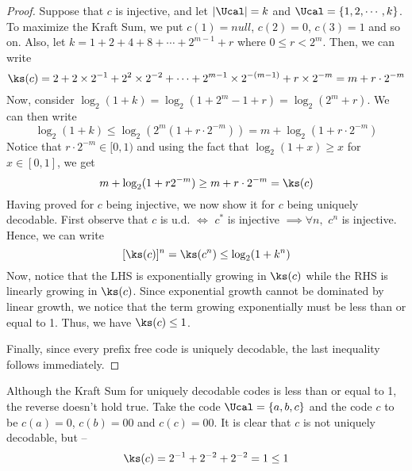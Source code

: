 \begin{proof}
Suppose that $c$ is injective, and let $|\Ucal| = k$ and $\Ucal = \{1, 2, \cdots, k\}$. To maximize the Kraft Sum, we put $c(1) = null$, $c(2) = 0$, $c(3) = 1$ and so on. Also, let $k = 1 + 2 + 4 + 8 + \cdots + 2^{m-1} + r$ where $0 \leq r < 2^m$. Then, we can write
\[\ks(c) = 2 + 2 \times 2^{-1} + 2^2 \times 2^{-2} + \cdots + 2^{m-1}\times 2^{-(m-1)} + r \times 2^{-m} = m + r \cdot 2^{-m}\]
Now, consider $\log_2(1+k) = \log_2(1 + 2^{m} - 1 + r) = \log_2(2^m + r)$. We can then write \[\log_2(1+k) \leq \log_2(2^m(1+r\cdot2^{-m})) = m + \log_2(1+r\cdot 2^{-m}) \]
Notice that $r\cdot 2^{-m} \in [0,1)$ and using the fact that $\log_2(1+x) \geq x$ for $x\in[0,1]$, we get
\[m + \log_2(1+r2^{-m}) \geq m + r\cdot2^{-m} = \ks(c)\]
Having proved for $c$ being injective, we now show it for $c$ being uniquely decodable. First observe that $c$ is u.d. $\iff$ $c^*$ is injective $\implies \forall n,$ $c^n$ is injective. Hence, we can write
\[
[\ks(c)]^n = \ks(c^n) \leq \log_2(1+k^n)
\]
Now, notice that the LHS is exponentially growing in $\ks(c)$ while the RHS is linearly growing in $\ks(c)$. Since exponential growth cannot be dominated by linear growth, we notice that the term growing exponentially must be less than or equal to 1. Thus, we have $\ks(c) \leq 1$.

\noindent
Finally, since every prefix free code is uniquely decodable, the last inequality follows immediately.
\end{proof}
\begin{remark}
Although the Kraft Sum for uniquely decodable codes is less than or equal to 1, the reverse doesn't hold true. Take the code $\Ucal = \{a,b,c\}$ and the code $c$ to be $c(a) = 0$, $c(b) = 00$ and $c(c) = 00$. It is clear that $c$ is not uniquely decodable, but --
\[
\ks(c) = 2^{-1} + 2^{-2} + 2^{-2}  = 1 \leq 1
\]
\end{remark}